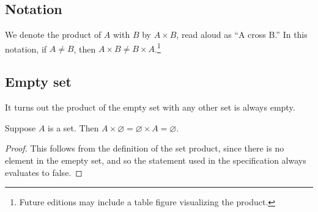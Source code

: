 \subsection*{Notation}

We denote the product of $A$ with $B$ by $A \times  B$, read aloud as ``A cross B.''
In this notation, if $A \neq B$, then $A \times  B \neq B \times  A$.\footnote{Future editions may include a table figure visualizing the product.}

\subsection*{Empty set}

It turns out the product of the empty set with any other set is always empty.

\begin{proposition}
Suppose $A$ is a set.
Then $A \times  \varnothing = \varnothing \times  A = \varnothing$.
\begin{proof}This follows from the definition of the set product, since there is no element in the emepty set, and so the statement used in the specification always evaluates to false.\end{proof}
\end{proposition}
